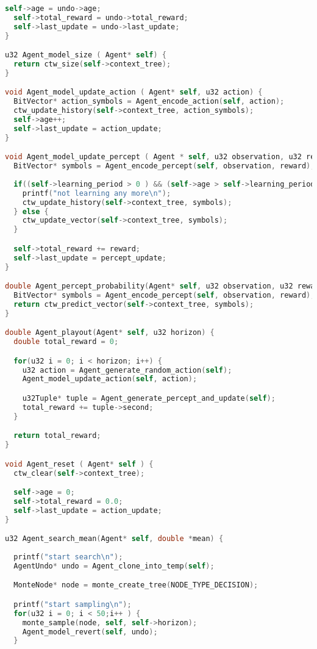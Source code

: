 \documentclass[fancychapters]{report}   	%
\begin{document}
\begin{lstlisting}[language=C,caption={agent.c}]
  self->age = undo->age;
  self->total_reward = undo->total_reward;
  self->last_update = undo->last_update;
}

u32 Agent_model_size ( Agent* self) {
  return ctw_size(self->context_tree);
}

void Agent_model_update_action ( Agent* self, u32 action) {
  BitVector* action_symbols = Agent_encode_action(self, action);
  ctw_update_history(self->context_tree, action_symbols);
  self->age++;
  self->last_update = action_update;
}

void Agent_model_update_percept ( Agent * self, u32 observation, u32 reward ) {
  BitVector* symbols = Agent_encode_percept(self, observation, reward);
    
  if((self->learning_period > 0 ) && (self->age > self->learning_period)) {
    printf("not learning any more\n");
    ctw_update_history(self->context_tree, symbols);
  } else {
    ctw_update_vector(self->context_tree, symbols);
  }

  self->total_reward += reward;
  self->last_update = percept_update;
}

double Agent_percept_probability(Agent* self, u32 observation, u32 reward) {
  BitVector* symbols = Agent_encode_percept(self, observation, reward);
  return ctw_predict_vector(self->context_tree, symbols);
}

double Agent_playout(Agent* self, u32 horizon) {
  double total_reward = 0;

  for(u32 i = 0; i < horizon; i++) {
    u32 action = Agent_generate_random_action(self);
    Agent_model_update_action(self, action);

    u32Tuple* tuple = Agent_generate_percept_and_update(self);
    total_reward += tuple->second;
  }

  return total_reward;
}

void Agent_reset ( Agent* self ) {
  ctw_clear(self->context_tree);

  self->age = 0;
  self->total_reward = 0.0;
  self->last_update = action_update;
}

u32 Agent_search_mean(Agent* self, double *mean) {
  
  printf("start search\n");
  AgentUndo* undo = Agent_clone_into_temp(self);

  MonteNode* node = monte_create_tree(NODE_TYPE_DECISION);

  printf("start sampling\n");
  for(u32 i = 0; i < 50;i++ ) {
    monte_sample(node, self, self->horizon);
    Agent_model_revert(self, undo);
  }


\end{lstlisting}
\end{document}
